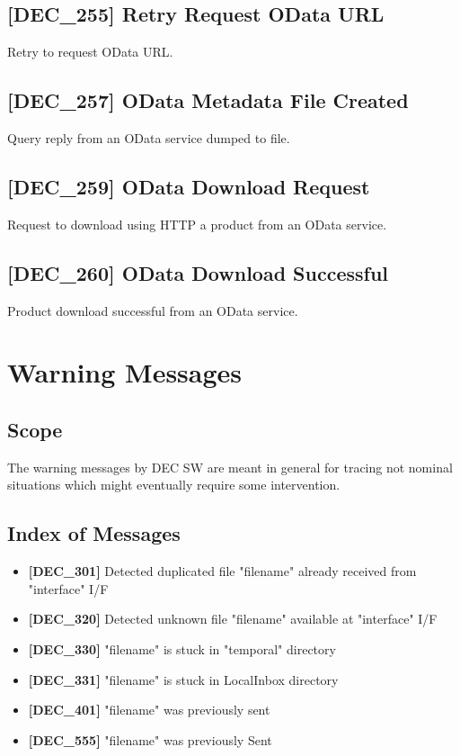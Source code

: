 \documentclass[dec_sum_main.tex]{subfiles}
\begin{document}
\subsection{[DEC\_255] Retry Request OData URL}
Retry to request OData URL.

\label{DEC257}
\subsection{[DEC\_257] OData Metadata File  Created}
Query reply from an OData service dumped to file.

\label{DEC259}
\subsection{[DEC\_259] OData Download Request}
Request to download using HTTP a product from an OData service.

\label{DEC260}
\subsection{[DEC\_260] OData Download Successful}
Product download successful from an OData service.


\newpage

\section{Warning Messages}

\subsection{Scope}
The warning messages by DEC SW are meant in general for tracing not nominal situations which might eventually require some intervention.

\subsection{Index of Messages}

\begin{itemize}
	\item \textbf{[DEC\_301]} Detected duplicated file "filename" already received from "interface" I/F
	\item \textbf{[DEC\_320]} Detected unknown file "filename" available at "interface" I/F
	\item \textbf{[DEC\_330]} "filename" is stuck in "temporal" directory
	\item \textbf{[DEC\_331]} "filename" is stuck in LocalInbox directory
	\item \textbf{[DEC\_401]} "filename" was previously sent
	\item \textbf{[DEC\_555]} "filename" was previously Sent
\end{itemize}
\end{document}

